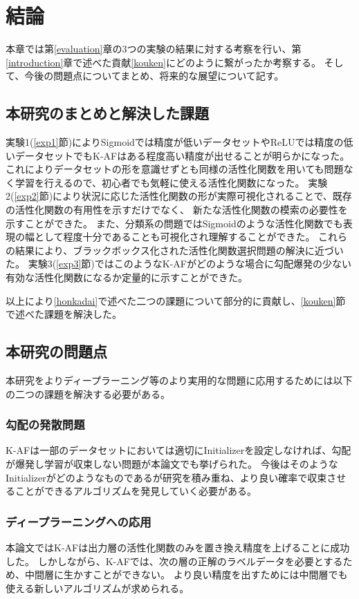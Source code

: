 \chapter{結論}
\label{conclusion}

本章では第\ref{evaluation}章の3つの実験の結果に対する考察を行い、第\ref{introduction}章で述べた貢献\ref{kouken}にどのように繋がったか考察する。
そして、今後の問題点についてまとめ、将来的な展望について記す。


\section{本研究のまとめと解決した課題}
\label{matome}


 実験1(\ref{exp1}節)によりSigmoidでは精度が低いデータセットやReLUでは精度の低いデータセットでもK-AFはある程度高い精度が出せることが明らかになった。
これによりデータセットの形を意識せずとも同様の活性化関数を用いても問題なく学習を行えるので、初心者でも気軽に使える活性化関数になった。
 実験2(\ref{exp2}節)により状況に応じた活性化関数の形が実際可視化されることで、既存の活性化関数の有用性を示すだけでなく、
 新たな活性化関数の模索の必要性を示すことができた。
 また、分類系の問題ではSigmoidのような活性化関数でも表現の幅として程度十分であることも可視化され理解することができた。
これらの結果により、ブラックボックス化された活性化関数選択問題の解決に近づいた。
 実験3(\ref{exp3}節)ではこのようなK-AFがどのような場合に勾配爆発の少ない有効な活性化関数になるか定量的に示すことができた。

以上により\ref{honkadai}で述べた二つの課題について部分的に貢献し、\ref{kouken}節で述べた課題を解決した。



\section{本研究の問題点}
本研究をよりディープラーニング等のより実用的な問題に応用するためには以下の二つの課題を解決する必要がある。

\subsection{勾配の発散問題}
K-AFは一部のデータセットにおいては適切にInitializerを設定しなければ、勾配が爆発し学習が収束しない問題が本論文でも挙げられた。
今後はそのようなInitializerがどのようなものであるが研究を積み重ね、より良い確率で収束させることができるアルゴリズムを発見していく必要がある。

\subsection{ディープラーニングへの応用}
本論文ではK-AFは出力層の活性化関数のみを置き換え精度を上げることに成功した。
しかしながら、K-AFでは、次の層の正解のラベルデータを必要とするため、中間層に生かすことができない。
より良い精度を出すためには中間層でも使える新しいアルゴリズムが求められる。



